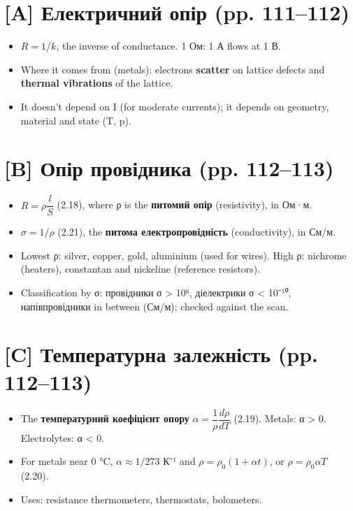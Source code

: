 \documentclass[11pt,a4paper,oneside]{book}
\begin{document}
\section*{[A] Електричний опір (pp. 111–112)}
\begin{itemize}
\item $R = 1/k$, the inverse of conductance. 1 Ом: 1 А flows at 1 В.
\item Where it comes from (metals): electrons \textbf{scatter} on lattice defects and \textbf{thermal vibrations} of the lattice.
\item It doesn't depend on I (for moderate currents); it depends on geometry, material and state (T, p).
\end{itemize}

\section*{[B] Опір провідника (pp. 112–113)}
\begin{itemize}
\item $R = \rho\dfrac{l}{S}$ (2.18), where ρ is the \textbf{питомий опір} (resistivity), in Ом·м.
\item $\sigma = 1/\rho$ (2.21), the \textbf{питома електропровідність} (conductivity), in См/м.
\item Lowest ρ: silver, copper, gold, aluminium (used for wires). High ρ: nichrome (heaters), constantan and nickeline (reference resistors).
\item Classification by σ: провідники σ > 10⁶, діелектрики σ < 10⁻¹⁰, напівпровідники in between (См/м); checked against the scan.
\end{itemize}

\section*{[C] Температурна залежність (pp. 112–113)}
\begin{itemize}
\item The \textbf{температурний коефіцієнт опору} $\alpha = \dfrac1\rho\dfrac{d\rho}{dT}$ (2.19). Metals: α > 0. Electrolytes: α < 0.
\item For metals near 0 °C, $\alpha\approx 1/273$ К⁻¹ and $\rho = \rho_0(1+\alpha t)$, or $\rho = \rho_0\alpha T$ (2.20).
\item Uses: resistance thermometers, thermostats, bolometers.
\end{itemize}
\end{document}
